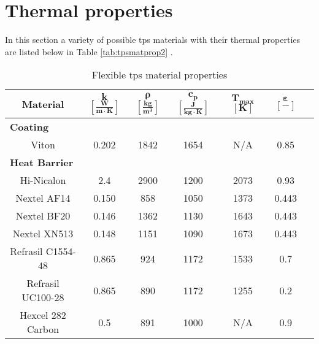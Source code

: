 \section{Thermal properties} \label{sec:Thermoprop}
In this section a variety of possible \gls{tps} materials with their thermal properties are listed below in Table \ref{tab:tpsmatprop2} \cite{Corso2009,Corso2011,DuPont2011,Smith2011,Nye,Zinkle1998}.

\begin{table}[ht]
	\caption {Flexible \acrlong{tps} material properties}
	\centering
	\begin{tabular}{|c|c|c|c|c|c|c|}
		\hline
		\textbf{Material}         & \textbf{ $\mathbf{k}$ $\mathbf{\left[\frac{W}{m\cdot K}\right]} $} & \textbf{ $\mathbf{ \rho }$ $\mathbf{ \left[ \frac{kg}{m^3} \right] }$} & \textbf{  $\mathbf{ c_{p} }$ $\mathbf{ \left[ \frac{J}{kg \cdot K} \right] }$ }& \textbf{ $\mathbf{ T_{max} }$ $\mathbf{ [ K ] }$} &\textbf{ $\mathbf{ \varepsilon }$ $\mathbf{ [ - ] }$} \\[1.6ex]   \hline \hline
		\multicolumn{6}{|l|}{\textbf{Coating}}			\\ \hline
		Viton       & 0.202 & 1842 & 1654 & N/A	 & 0.85 \\ \hline
		\multicolumn{6}{|l|}{\textbf{Heat Barrier}}			\\ \hline
		Hi-Nicalon      & 2.4       & 2900   & 1200   & 2073      & 0.93        \\ \hline
		Nextel AF14       & 0.150                                                 & 858                                        & 1050                                            & 1373	 & 0.443 \\ \hline
		Nextel BF20       & 0.146	& 1362                                        & 1130 & 1643	 & 0.443 \\ \hline
		Nextel XN513      & 0.148                                                 & 1151                                       & 1090                                            & 1673	 & 0.443 \\ \hline
		Refrasil C1554-48 & 0.865                                                 & 924                                        & 1172                                            & 1533	 & 0.7 \\ \hline
		Refrasil UC100-28 & 0.865                                                 & 890                                        & 1172                                            & 1255  & 0.2 \\ \hline
		Hexcel 282 Carbon & 0.5                                                   & 891                                        & 1000                                            & N/A 	 & 0.9  \\ \hline

\end{tabular}
\end{table}
